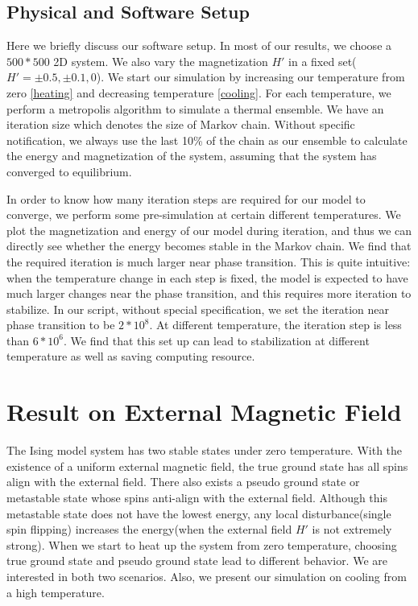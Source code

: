 \documentclass[11pt]{article}
\begin{document}
\subsection{Physical and Software Setup}

Here we briefly discuss our software setup. In most of our results, we choose a $500*500$ 2D system. We also vary the magnetization $H'$ in a fixed set($H' = \pm 0.5,\pm0.1,0$). We start our simulation by increasing our temperature from zero \ref{heating} \label{heating} and decreasing temperature \ref{cooling}. For each temperature, we perform a metropolis algorithm to simulate a thermal ensemble. We have an iteration size which denotes the size of Markov chain. Without specific notification, we always use the last 10\% of the chain as our ensemble to calculate the energy and magnetization of the system, assuming that the system has converged to equilibrium.

In order to know how many iteration steps are required for our model to converge, we perform some pre-simulation at certain different temperatures. We plot the magnetization and energy of our model during iteration, and thus we can directly see whether the energy becomes stable in the Markov chain. We find that the required iteration is much larger near phase transition. This is quite intuitive: when the temperature change in each step is fixed, the model is expected to have much larger changes near the phase transition, and this requires more iteration to stabilize. In our script, without special specification, we set the iteration near phase transition to be $2*10^8$. At different temperature, the iteration step is less than $6*10^6$. We find that this set up can lead to stabilization at different temperature as well as saving computing resource.

 



\section{Result on External Magnetic Field}\label{result1}

The Ising model system has two stable states under zero temperature. With the existence of a uniform external magnetic field, the true ground state has all spins align with the external field. There also exists a pseudo ground state or metastable state whose spins anti-align with the external field. Although this metastable state does not have the lowest energy, any local disturbance(single spin flipping) increases the energy(when the external field $H'$ is not extremely strong). When we start to heat up the system from zero temperature, choosing true ground state and pseudo ground state lead to different behavior. We are interested in both two scenarios. Also, we present our simulation on cooling from a high temperature.
\end{document}
